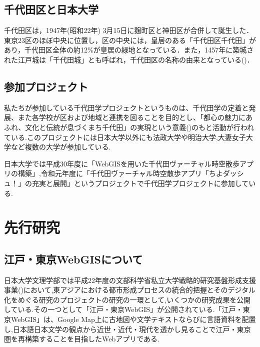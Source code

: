 \documentclass[a4paper, twoside]{jarticle}
\begin{document}
\begin{multicols}{2}
\subsection{千代田区と日本大学}
千代田区は，1947年(昭和22年) 3月15日に麹町区と神田区が合併して誕生した．東京23区のほぼ中央に位置し，区の中央には，皇居のある「千代田区千代田」があり，千代田区全体の約12\%が皇居の緑地となっている．また，1457年に築城された江戸城は「千代田城」とも呼ばれ，千代田区の名称の由来となっている(\cite{digi1})．

\subsection{参加プロジェクト}
私たちが参加している千代田学プロジェクトというものは、千代田学の定着と発展、また各学校が区および地域と連携を図ることを目的とし、「都心の魅力にあふれ、文化と伝統が息づくまち千代田」の実現という意義(\cite{chiyopro})のもと活動が行われている.このプロジェクトには日本大学以外にも法政大学や明治大学,大妻女子大学など複数の大学が参加している.\par
日本大学では平成30年度に「WebGISを用いた千代田ヴァーチャル時空散歩アプリの構築」,令和元年度に「千代田ヴァーチャル時空散歩アプリ「ちよダッシュ！」の充実と展開」というプロジェクトで千代田学プロジェクトに参加している.






\section{先行研究}


\subsection{江戸・東京WebGISについて}
日本大学文理学部では平成22年度の文部科学省私立大学戦略的研究基盤形成支援事業(\cite{monka})において,東アジアにおける都市形成プロセスの統合的把握とそのデジタル化をめぐる研究のプロジェクトの研究の一環として,いくつかの研究成果を公開 している.その一つとして「江戸・東京WebGIS」が公開されている.「江戸・東京WebGIS」は、Google Map上に古地図や文学テキストならびに言語資料を配置し,日本語日本文学の観点から近世・近代・現代を透かし見ることで江戸・東京圏を再構築することを目指したWebアプリである.


\end{multicols}
\end{document}
